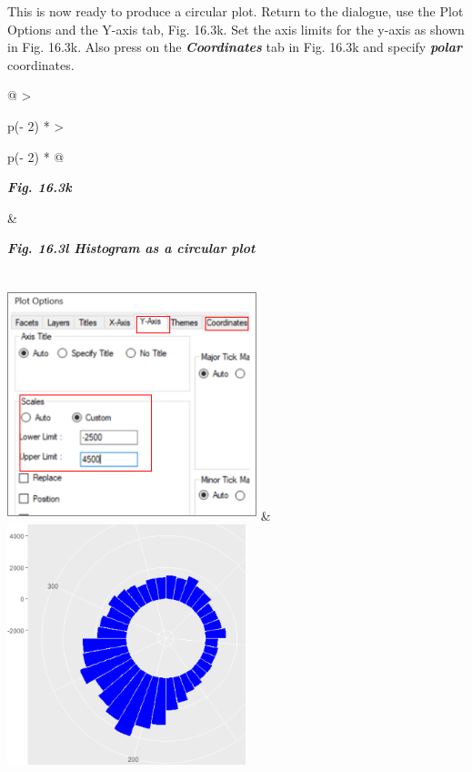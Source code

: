 \documentclass[
  letterpaper,
  DIV=11,
  numbers=noendperiod]{scrreprt}
\begin{document}
This is now ready to produce a circular plot. Return to the dialogue,
use the Plot Options and the Y-axis tab, Fig. 16.3k. Set the axis limits
for the y-axis as shown in Fig. 16.3k. Also press on the
\textbf{\emph{Coordinates}} tab in Fig. 16.3k and specify
\textbf{\emph{polar}} coordinates.

\begin{longtable}[]{@{}
  >{\raggedright\arraybackslash}p{(\columnwidth - 2\tabcolsep) * }
  >{\raggedright\arraybackslash}p{(\columnwidth - 2\tabcolsep) * }@{}}
\toprule\noalign{}
\begin{minipage}[b]{\linewidth}\raggedright
\textbf{\emph{Fig. 16.3k}}
\end{minipage} & \begin{minipage}[b]{\linewidth}\raggedright
\textbf{\emph{Fig. 16.3l Histogram as a circular plot}}
\end{minipage} \\
\midrule\noalign{}
\endhead
\bottomrule\noalign{}
\endlastfoot
\includegraphics[width=2.85611in,height=2.65873in]{figures/Fig16.3k.png}
&
\includegraphics[width=2.7277in,height=2.74353in]{figures/Fig16.3l.png} \\
\end{longtable}
\end{document}
